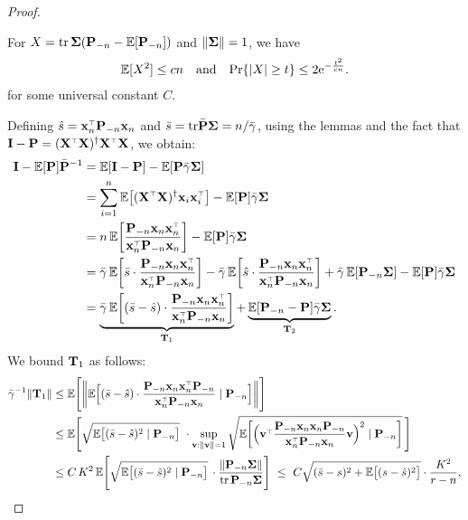 \documentclass[11pt]{article}
\begin{document}
\begin{proof}
\begin{lemma}\label{l:trace}
For $X=\mathrm{tr}\,\mathbf{\Sigma}(\mathbf P_{-n}-\mathbb E[\mathbf P_{-n}])$
and $\|\mathbf{\Sigma}\| = 1$, we have
\begin{align*}
  \mathbb E[X^2]\leq
  cn\quad\text{and}\quad\mathrm{Pr}\{|X|\geq t\}\leq 2 \mathrm{e}^{-\frac{t^2}{cn}}.
  \end{align*}
  for some universal constant $C$.
\end{lemma}

\noindent
Defining $\hat s = \x_n^\top\P_{-n}\x_n$ and $\bar s=\mathrm{tr}\bar{\mathbf P}\mathbf{\Sigma}=n/\bar\gamma$,
using the lemmas and the fact that $\I-\P=(\X^\top\X)^\dagger\X^\top\X$, we obtain:
\begin{align*}
  \I - \E[\P]\bar\P^{-1}
  &= \E[\I -\P] - \E[\P\bar\gamma\Sigmab]\\
  &=\sum_{i=1}^n\E\big[(\X^\top\X)^\dagger\x_i\x_i^\top\big] -
    \E[\P]\bar\gamma\Sigmab\\
  &=n\,\E\bigg[\frac{\P_{-n}\x_n\x_n^\top}{\x_n^\top\P_{-n}\x_n}\bigg] -
    \E[\P]\bar\gamma\Sigmab\\
  &=\bar\gamma\,
    \E\bigg[\bar s\cdot\frac{\P_{-n}\x_n\x_n^\top} {\x_n^\top\P_{-n}\x_n}\bigg]
    -\bar\gamma\,\E\bigg[\hat s
    \cdot\frac{\P_{-n}\x_n\x_n^\top}{\x_n^\top\P_{-n}\x_n}\bigg] +
    \bar\gamma\,\E[\P_{-n}\Sigmab]
    -\E[\P]\bar\gamma\Sigmab\\
  &=\underbrace{\bar\gamma\,\E\bigg[(\bar s - \hat s)
    \cdot\frac{\P_{-n}\x_n\x_n^\top}{\x_n^\top\P_{-n}\x_n}\bigg]}_{\T_1}
+    \underbrace{\E[\P_{-n}-\P]\bar\gamma\Sigmab}_{\T_2}.
\end{align*}
We bound $\mathbf{T}_1$ as follows:
\begin{align*}
  \bar\gamma^{-1}\|\T_1\|
  &\leq \E\Bigg[\bigg\|\E\Big[(\bar s-\hat
  s)\cdot\frac{\P_{-n}\x_n\x_n^\top\P_{-n}}{\x_n^\top\P_{-n}\x_n}\mid
  \P_{-n}\Big]\bigg\|\Bigg]\\
  &\leq \E\Bigg[\sqrt{\E\big[(\bar s - \hat
  s)^2\mid
    \P_{-n}\big]}\
    \cdot\sup_{\v:\|\v\|=1}\sqrt{\E\bigg[\Big(\v^\top\frac{\P_{-n}\x_n\x_n\P_{-n}}{\x_n^\top\P_{-n}\x_n}\v\Big)^2\mid\P_{-n}\bigg]}\,\Bigg]\\
  &\leq  C\,K^2\,\E\Bigg[\sqrt{\E\big[(\bar s - \hat
  s)^2\mid
    \P_{-n}\big]}\,
    \cdot \frac{\|\P_{-n}\Sigmab\|}{\tr\,\P_{-n}\Sigmab}\Bigg]
    \  \leq\ C\sqrt{(\bar s - s)^2 + \E\big[(s - \hat s)^2\big]}\cdot \frac{K^2}{r-n},

\end{align*}
\end{proof}
\end{document}

